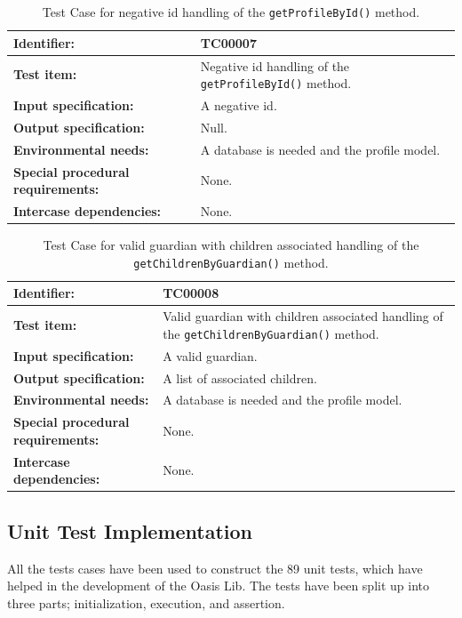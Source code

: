 \begin{table}[htbp]
	\centering
		\begin{tabular}{| p{4.5cm} | m{9cm} |}
			\hline
			\textbf{Identifier:} 					& TC00007 \\ \hline
			\textbf{Test item:}						& Negative id handling of the \texttt{getProfileById()} method. \\ \hline
			\textbf{Input specification:}			& A negative id. \\ \hline
			\textbf{Output specification:} 			& Null. \\ \hline
			\textbf{Environmental needs:}			& A database is needed and the profile model. \\ \hline
			\textbf{Special procedural requirements:}	& None. \\ \hline
			\textbf{Intercase dependencies:}			& None. \\ \hline
		\end{tabular}
	\caption{Test Case for negative id handling of the \texttt{getProfileById()} method.}
	\label{tab:TestCase_NegativeIdHandling}
\end{table}

\begin{table}[htbp]
	\centering
		\begin{tabular}{| p{4.5cm} | m{9cm} |}
			\hline
			\textbf{Identifier:} 					& TC00008 \\ \hline
			\textbf{Test item:}						& Valid guardian with children associated handling of the \texttt{getChildrenByGuardian()} method. \\ \hline
			\textbf{Input specification:}			& A valid guardian. \\ \hline
			\textbf{Output specification:} 			& A list of associated children. \\ \hline
			\textbf{Environmental needs:}			& A database is needed and the profile model. \\ \hline
			\textbf{Special procedural requirements:}	& None. \\ \hline
			\textbf{Intercase dependencies:}			& None. \\ \hline
		\end{tabular}
	\caption{Test Case for valid guardian with children associated handling of the \texttt{getChildrenByGuardian()} method.}
	\label{tab:TestCase_ValidGuardianWithChildrenAssociatedHandling}
\end{table}


\subsection{Unit Test Implementation}
All the tests cases have been used to construct the 89 unit tests, which have helped in the development of the Oasis Lib.
The tests have been split up into three parts; initialization, execution, and assertion.

